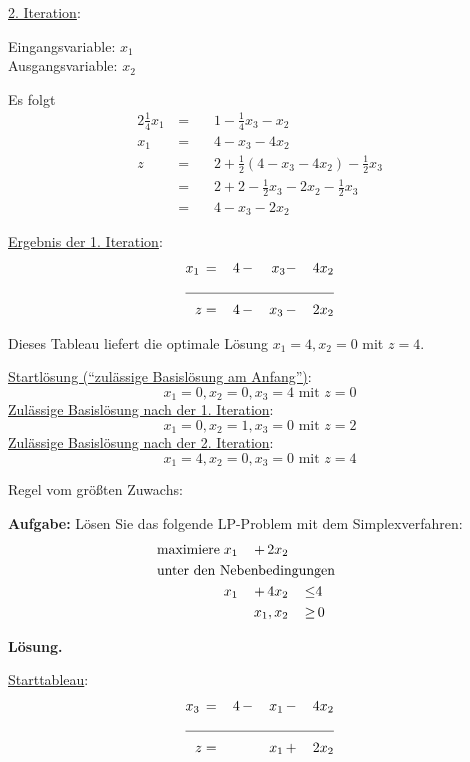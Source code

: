 \documentclass[10pt,a4paper,oneside,ngerman,numbers=noenddot]{scrartcl}
\begin{document}
		\underline{2. Iteration}:
		
		Eingangsvariable: $x_{1}$\\
		Ausgangsvariable: $x_{2}$
		
		Es folgt
		\begin{alignat*}{2}
			\frac{1}{4}x_{1} \,&=&&\, 1 - \frac{1}{4}x_{3} - x_{2} \\
			x_{1} \,&=&&\, 4 - x_{3} - 4x_{2} \\
			z \,&=&&\, 2 + \frac{1}{2}\left(4 - x_{3} - 4x_{2}\right) - \frac{1}{2}x_{3} \\
			&=&&\, 2 + 2 - \frac{1}{2}x_{3} - 2x_{2} - \frac{1}{2}x_{3} \\
			&=&&\, 4 - x_{3} - 2x_{2}
		\end{alignat*}
		
		\underline{Ergebnis der 1. Iteration}:
		\begin{alignat*}{4}
			x_{1} \,&=&\, 4 \,&-&\, x_{3} &-&\, 4x_{2} \\ \cline{1 - 7}
			z &=& 4 \,&-&\, x_{3} \,&-&\, 2x_{2}
		\end{alignat*}
		
		Dieses Tableau liefert die optimale Lösung $x_{1} = 4, x_{2} = 0$ mit $z = 4$.
		
		\underline{Startlösung ("`zulässige Basislösung am Anfang"')}:
		\[
			x_{1} = 0, x_{2} = 0, x_{3} = 4 \text{ mit } z = 0
		\]
		\underline{Zulässige Basislösung nach der 1. Iteration}:
		\[
			x_{1} = 0, x_{2} = 1, x_{3} = 0 \text{ mit } z = 2
		\]
		\underline{Zulässige Basislösung nach der 2. Iteration}:
		\[
			x_{1} = 4, x_{2} = 0, x_{3} = 0 \text{ mit } z = 4
		\]			
				
			Regel vom größten Zuwachs:
			
			\textbf{Aufgabe:} Lösen Sie das folgende LP-Problem mit dem Simplexverfahren:
		\begin{alignat*}{3}
			\text{maximiere}\; & x_{1} \,&+&\, 2x_{2} && \\
			\multicolumn{6}{l}{\text{unter den Nebenbedingungen}} && \\
			\;& x_{1} \,&+&\, 4x_{2} \,&\leq & 4 \\
			\multicolumn{4}{r}{$x_{1}, x_{2}$} \,&\geq &\, 0
		\end{alignat*}
		
		\textbf{Lösung.}
		
		\underline{Starttableau}:
		\begin{alignat*}{4}
			x_{3} \,&=&\, 4 \,&-&\, x_{1} \,&-&\, 4x_{2} \\ \cline{1 - 7}
			z &=& &&\, x_{1} \,&+&\, 2x_{2}
		\end{alignat*}
		
\end{document}
